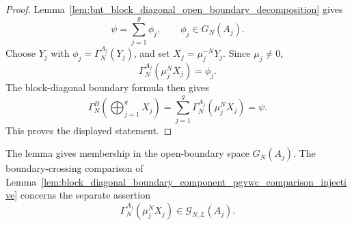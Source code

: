 \begin{proof}
    \leanok
    Lemma~\ref{lem:bnt_block_diagonal_open_boundary_decomposition} gives
    \[
        \psi=\sum_{j=1}^g\phi_j,
        \qquad
        \phi_j\in G_N(A_j).
    \]
    Choose \(Y_j\) with \(\phi_j=\Gamma_N^{A_j}(Y_j)\), and set
    \(X_j=\mu_j^{-N}Y_j\). Since \(\mu_j\ne0\),
    \[
        \Gamma_N^{A_j}(\mu_j^NX_j)=\phi_j.
    \]
    The block-diagonal boundary formula then gives
    \[
        \Gamma_N^B\!\left(\bigoplus_{j=1}^gX_j\right)
        =
        \sum_{j=1}^g \Gamma_N^{A_j}(\mu_j^NX_j)
        =
        \psi.
    \]
    This proves the displayed statement.
\end{proof}

The lemma gives membership in the open-boundary space \(G_N(A_j)\). The
boundary-crossing comparison of
Lemma~\ref{lem:block_diagonal_boundary_component_pgvwc_comparison_injective}
concerns the separate assertion
\[
    \Gamma_N^{A_j}(\mu_j^N X_j)\in\mathcal G_{N,L}(A_j).
\]
